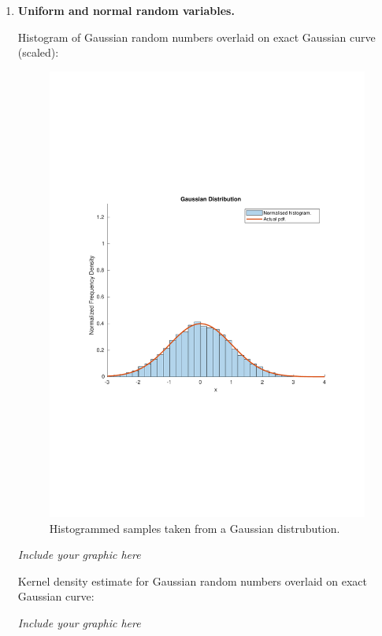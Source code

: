 \documentclass[12pt]{article}
\begin{document}
\begin{enumerate}
\item {\bf Uniform and normal random variables.}

Histogram of Gaussian random numbers overlaid on exact Gaussian curve (scaled):
 

\begin{figure}
\includegraphics[width=\textwidth]{figures/gaussian-histogram.pdf}
  \caption{Histogrammed samples taken from a Gaussian distrubution.}
\end{figure}

{\em Include your graphic here}
\vspace{3in}



Kernel density estimate for Gaussian random numbers overlaid on exact Gaussian curve:


{\em Include your graphic here}
\vspace{3in}




\end{enumerate}
\end{document}

